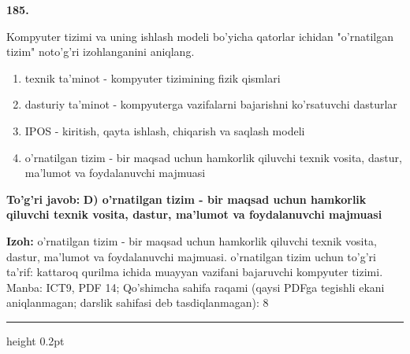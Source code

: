 \documentclass[10pt,a4paper]{article}
\begin{document}
{\bfseries\sffamily\color{ink} 185.}
\par
Kompyuter tizimi va uning ishlash modeli bo'yicha qatorlar ichidan "o'rnatilgan tizim" noto'g'ri izohlanganini aniqlang.
\begin{enumerate}[label=\Alph*),leftmargin=9mm]
\item texnik ta'minot - kompyuter tizimining fizik qismlari
\item dasturiy ta'minot - kompyuterga vazifalarni bajarishni ko'rsatuvchi dasturlar
\item IPOS - kiritish, qayta ishlash, chiqarish va saqlash modeli
\item o'rnatilgan tizim - bir maqsad uchun hamkorlik qiluvchi texnik vosita, dastur, ma'lumot va foydalanuvchi majmuasi
\end{enumerate}
\begin{tcolorbox}[enhanced,breakable,colback=teal!4,colframe=teal!60!black,boxrule=0.45pt,arc=1.2mm,left=2.7mm,right=2.7mm,top=1.8mm,bottom=1.8mm,before skip=2mm,after skip=2mm]
{\bfseries\sffamily\color{teal}To'g'ri javob:} \textbf{D) o'rnatilgan tizim - bir maqsad uchun hamkorlik qiluvchi texnik vosita, dastur, ma'lumot va foydalanuvchi majmuasi}
\par\smallskip
{\bfseries Izoh:} o'rnatilgan tizim - bir maqsad uchun hamkorlik qiluvchi texnik vosita, dastur, ma'lumot va foydalanuvchi majmuasi. o'rnatilgan tizim uchun to'g'ri ta'rif: kattaroq qurilma ichida muayyan vazifani bajaruvchi kompyuter tizimi. Manba: ICT9, PDF 14; Qo'shimcha sahifa raqami (qaysi PDFga tegishli ekani aniqlanmagan; darslik sahifasi deb tasdiqlanmagan): 8
\end{tcolorbox}
\vspace{2mm}\hrule height 0.2pt\vspace{3mm}
\end{document}
